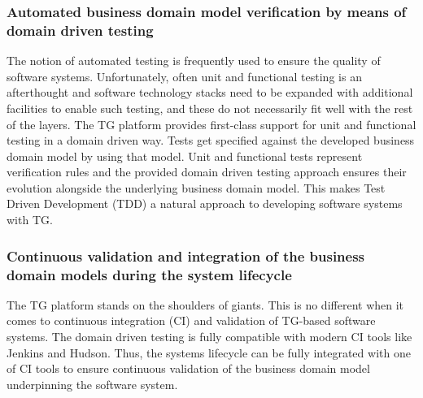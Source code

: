\documentclass[a4paper,10pt,twocolumn,oneside,openright,final]{memoir}
\begin{document}
\subsubsection*{Automated business domain model verification by means of domain driven testing}
	The notion of automated testing is frequently used to ensure the quality of software systems.
	Unfortunately, often unit and functional testing is an afterthought and software technology stacks need to be expanded with additional facilities to enable such testing, and these do not necessarily fit well with the rest of the layers.
	The TG platform provides first-class support for unit and functional testing in a domain driven way.
	Tests get specified against the developed business domain model by using that model.
	Unit and functional tests represent verification rules and the provided domain driven testing approach ensures their evolution alongside the underlying business domain model.
	This makes Test Driven Development (TDD) a natural approach to developing software systems with TG.
	
\subsubsection*{Continuous validation and integration of the business domain models during the system lifecycle}
	The TG platform stands on the shoulders of giants.
	This is no different when it comes to continuous integration (CI) and validation of TG-based software systems.
	The domain driven testing is fully compatible with modern CI tools like Jenkins and Hudson.
	Thus, the systems lifecycle can be fully integrated with one of CI tools to ensure continuous validation of the business domain model underpinning the software system.
\end{document}
